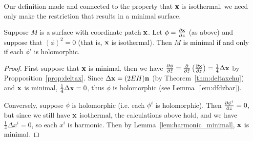   Our definition made and connected to the property that $\mathbf{x}$ is isothermal, we need only make the restriction that results in a minimal surface.

  \begin{thm}
    Suppose $M$ is a surface with coordinate patch $\mathbf{x}$. Let $\phi = \frac{\partial\mathbf{x}}{\partial z}$ (as above) and suppose that $(\phi)^2 = 0$ (that is, $\mathbf{x}$ is isothermal). Then $M$ is minimal if and only if each $\phi^i$ is holomorphic.
  \end{thm}
  \begin{proof}
    First suppose that $\mathbf{x}$ is minimal, then we have $\frac{\partial\phi}{\partial\bar{z}} = \frac{\partial}{\partial\bar{z}}\left(\frac{\partial\mathbf{x}}{\partial z}\right) = \frac{1}{4}\Delta\mathbf{x}$ by Propposition~\ref{prop:deltax}. Since $\Delta\mathbf{x} = (2EH)\mathbf{n}$ (by Theorem~\ref{thm:deltaxehu}) and $\mathbf{x}$ is minimal, $\frac{1}{4}\Delta\mathbf{x} = 0$, thus $\phi$ is holomorphic (see Lemma~\ref{lem:dfdzbar}).

    Conversely, suppose $\phi$ is holomorphic (i.e. each $\phi^i$ is holomorphic). Then $\frac{\partial\phi^i}{\partial\bar{z}} = 0$, but since we still have $\mathbf{x}$ isothermal, the calculations above hold, and we have $\frac{1}{4}\Delta x^i = 0$, so each $x^i$ is harmonic. Then by Lemma~\ref{lem:harmonic_minimal}, $\mathbf{x}$ is minimal. 
  \end{proof}

